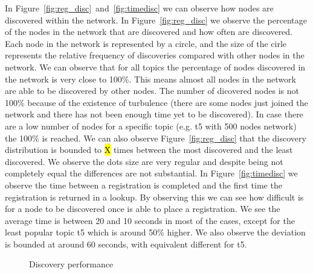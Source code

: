 

In Figure~\ref{fig:reg_disc}~and~\ref{fig:timedisc} we can observe how nodes are discovered within the network.
In Figure~\ref{fig:reg_disc} we observe the percentage of the nodes in the network that are discovered and how often are discovered.
Each node in the network is represented by a circle, and the size of the cirle represents the relative frequency of discoveries compared with other nodes in the network.
We can observe that for all topics the percentage of nodes discovered in the network is very close to 100\%. This means almost all nodes in the network are able to be discovered by other nodes. The number of dicovered nodes is not 100\% because of the existence of turbulence (there are some nodes just joined the network and there has not been enough time yet to be discovered). In case there are a low number of nodes for a specific topic (e.g. t5 with 500 nodes network) the 100\% is reached.
We can also observe Figure~\ref{fig:reg_disc} that the discovery distribution is bounded to \hl{X} times between the most discovered and the least discovered.
We observe the dots size are very regular and despite being not completely equal the differences are not substantial. 
In Figure~\ref{fig:timedisc} we observe the time between a registration is completed and the first time the registration
is returned in a lookup.
By observing this we can see how difficult is for a node to be discovered once is able to place a registration. 
We see the average time is between 20 and 10 seconds in most of the cases, except for the least popular topic t5 which is around 50\% higher. 
We also observe the deviation is bounded at around 60 seconds, with equivalent different for t5.


\begin{figure}[!h]
\centering
{} 
\hspace{-0.25cm}
 \caption{Discovery performance} 
\label{fig:discovery}
\vspace{-0.15in}
\end{figure}   


